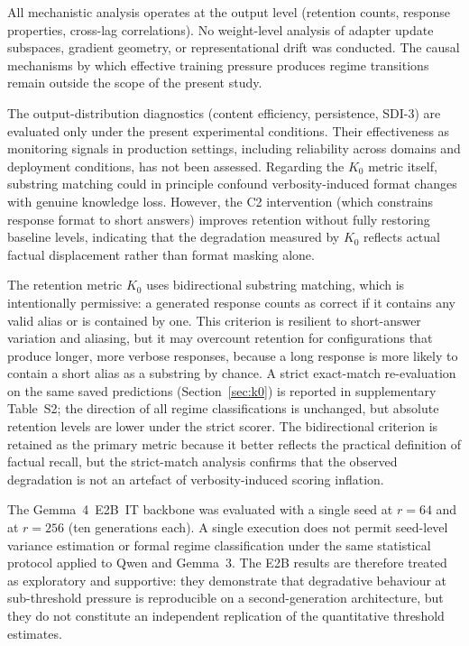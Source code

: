 \documentclass[a4paper,fleqn]{cas-dc}
\newif\ifshowchanges
\newcommand{\rev}[1]{\ifshowchanges{\color{blue}#1}\else{#1}\fi}
\begin{document}
All mechanistic analysis operates at the output level (retention counts, response
properties, cross-lag correlations). No weight-level analysis of adapter update
subspaces, gradient geometry, or representational drift was conducted. The causal
mechanisms by which effective training pressure produces regime transitions
remain outside the scope of the present study.

The output-distribution diagnostics (content efficiency, persistence, SDI-3) are
evaluated only under the present experimental conditions. Their effectiveness as
monitoring signals in production settings, including reliability across domains
and deployment conditions, has not been assessed. Regarding the $K_0$ metric
itself, substring matching could in principle confound verbosity-induced format
changes with genuine knowledge loss. However, the C2 intervention (which
constrains response format to short answers) improves retention without fully
restoring baseline levels, indicating that the degradation measured by $K_0$
reflects actual factual displacement rather than format masking alone.

\rev{The retention metric $K_0$ uses bidirectional substring matching, which
is intentionally permissive: a generated response counts as correct if it
contains any valid alias or is contained by one. This criterion is resilient to
short-answer variation and aliasing, but it may overcount retention for
configurations that produce longer, more verbose responses, because a long
response is more likely to contain a short alias as a substring by chance.
A strict exact-match re-evaluation on the same saved predictions
(Section~\ref{sec:k0}) is reported in supplementary Table~S2; the direction of
all regime classifications is unchanged, but absolute retention levels are
lower under the strict scorer. The bidirectional criterion is retained as the
primary metric because it better reflects the practical definition of factual
recall, but the strict-match analysis confirms that the observed degradation
is not an artefact of verbosity-induced scoring inflation.}

\rev{The Gemma~4~E2B~IT backbone was evaluated with a single seed at $r=64$
and at $r=256$ (ten generations each). A single execution does not permit
seed-level variance estimation or formal regime classification under the
same statistical protocol applied to Qwen and Gemma~3. The E2B results are
therefore treated as exploratory and supportive: they demonstrate that degradative
behaviour at sub-threshold pressure is reproducible on a second-generation
architecture, but they do not constitute an independent replication of the
quantitative threshold estimates.}
\end{document}
